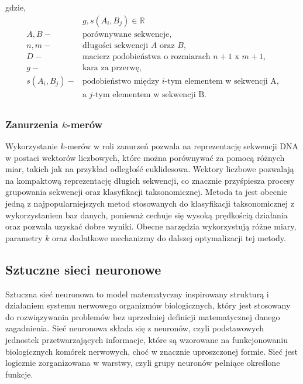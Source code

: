             gdzie,
            \begin{align*} 
                & g, s(A_i, B_j) \in \mathbb{R} \\
                A, B -& \text{porównywane sekwencje}, \\
                n, m -& \text{długości sekwencji } A \text{ oraz } B, \\
                D -& \text{macierz podobieństwa o rozmiarach } n + 1 \text{ x } m + 1, \\
                g -& \text{kara za przerwę}, \\
                s(A_i, B_j) -& \text{podobieństwo między } i \text{-tym elementem w sekwencji A,} \\ 
                & \text{a } j \text{-tym elementem w sekwencji B}. \\
            \end{align*}

        \subsubsection{Zanurzenia $k$-merów}
            
            Wykorzystanie $k$-merów w roli zanurzeń pozwala na reprezentację sekwencji DNA w postaci wektorów liczbowych, które można porównywać za pomocą różnych miar, takich jak na przykład odległość euklidesowa. Wektory liczbowe pozwalają na kompaktową reprezentację długich sekwencji, co znacznie przyśpiesza procesy grupowania sekwencji oraz klasyfikacji taksonomicznej. Metoda ta jest obecnie jedną z najpopularniejszych metod stosowanych do klasyfikacji taksonomicznej z wykorzystaniem baz danych, ponieważ cechuje się wysoką prędkością działania oraz pozwala uzyskać dobre wyniki. Obecne narzędzia wykorzystują różne miary, parametry $k$ oraz dodatkowe mechanizmy do dalszej optymalizacji tej metody.
    
    \subsection{Sztuczne sieci neuronowe}

        Sztuczna sieć neuronowa to model matematyczny inspirowany strukturą i działaniem systemu nerwowego organizmów biologicznych, który jest stosowany do rozwiązywania problemów bez uprzedniej definicji matematycznej danego zagadnienia\cite{Leksykon}. Sieć neuronowa składa się z neuronów, czyli podstawowych jednostek przetwarzających informacje, które są wzorowane na funkcjonowaniu biologicznych komórek nerwowych, choć w znacznie uproszczonej formie\cite{Leksykon}. Sieć jest logicznie zorganizowana w warstwy, czyli grupy neuronów pełniące określone funkcje\cite{Leksykon}.
        
